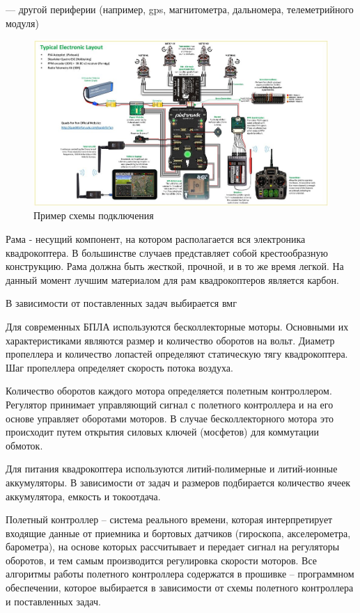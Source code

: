 --- другой периферии (например, gps, магнитометра, дальномера, телеметрийного модуля)

 \begin{figure}[H]
 	\centering
 	\includegraphics[width=0.9\linewidth]{pics/pix}
 	\caption{Пример схемы подключения
 	}
 	\label{fig:pix}
 \end{figure}
Рама - несущий компонент, на котором располагается вся электроника квадрокоптера. В большинстве случаев представляет собой крестообразную конструкцию. Рама должна быть жесткой, прочной, и в то же время легкой. На данный момент лучшим материалом для рам квадрокоптеров является карбон.

В зависимости от поставленных задач выбирается вмг

Для современных БПЛА используются бесколлекторные моторы. Основными их характеристиками являются размер и количество оборотов на вольт. 
Диаметр пропеллера и количество лопастей определяют статическую тягу квадрокоптера. Шаг пропеллера определяет скорость потока воздуха.

Количество оборотов каждого мотора определяется полетным контроллером. Регулятор принимает управляющий сигнал с полетного контроллера и на его основе управляет оборотами моторов. В случае бесколлекторного мотора это происходит путем открытия силовых ключей (мосфетов) для коммутации обмоток.

Для питания квадрокоптера используются литий-полимерные и литий-ионные аккумуляторы. В зависимости от задач и размеров подбирается количество ячеек аккумулятора, емкость и токоотдача.

Полетный контроллер -- система реального времени, которая интерпретирует входящие данные от приемника и бортовых датчиков (гироскопа, акселерометра, барометра), на основе которых рассчитывает и передает сигнал на регуляторы оборотов, и тем самым производится регулировка скорости моторов. Все алгоритмы работы полетного контроллера содержатся в прошивке -- программном обеспечении, которое выбирается в зависимости от схемы полетного контроллера и поставленных задач.

